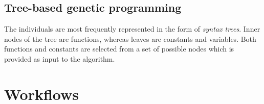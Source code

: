 \subsection{Tree-based genetic programming}
The individuals are most frequently represented in the form of \textit{syntax trees}. Inner nodes of the tree are functions, whereas leaves are constants and variables. Both functions and constants are selected from a set of possible nodes which is provided as input to the algorithm.


\section{Workflows}